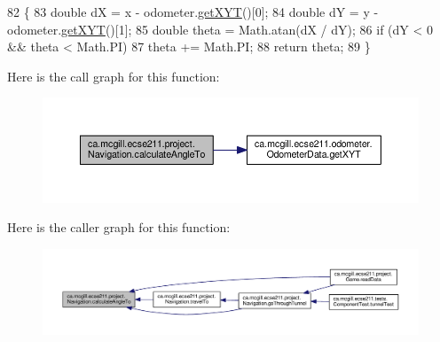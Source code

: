 \begin{DoxyCode}
82                                                      \{
83     \textcolor{keywordtype}{double} dX = x - odometer.\hyperlink{classca_1_1mcgill_1_1ecse211_1_1odometer_1_1_odometer_data_a8f40f0264c68f0cbed4fff1723ae7863}{getXYT}()[0];
84     \textcolor{keywordtype}{double} dY = y - odometer.\hyperlink{classca_1_1mcgill_1_1ecse211_1_1odometer_1_1_odometer_data_a8f40f0264c68f0cbed4fff1723ae7863}{getXYT}()[1];
85     \textcolor{keywordtype}{double} theta = Math.atan(dX / dY);
86     \textcolor{keywordflow}{if} (dY < 0 && theta < Math.PI)
87       theta += Math.PI;
88     \textcolor{keywordflow}{return} theta;
89   \}
\end{DoxyCode}
Here is the call graph for this function\+:\nopagebreak
\begin{figure}[H]
\begin{center}
\leavevmode
\includegraphics[width=350pt]{classca_1_1mcgill_1_1ecse211_1_1project_1_1_navigation_a4376e54162df8f123ca3b52e4fd2f38d_cgraph}
\end{center}
\end{figure}
Here is the caller graph for this function\+:\nopagebreak
\begin{figure}[H]
\begin{center}
\leavevmode
\includegraphics[width=350pt]{classca_1_1mcgill_1_1ecse211_1_1project_1_1_navigation_a4376e54162df8f123ca3b52e4fd2f38d_icgraph}
\end{center}
\end{figure}
\mbox{\label{classca_1_1mcgill_1_1ecse211_1_1project_1_1_navigation_ac9e260bcd619ffa4820d7d0de7ea1c12}} 
